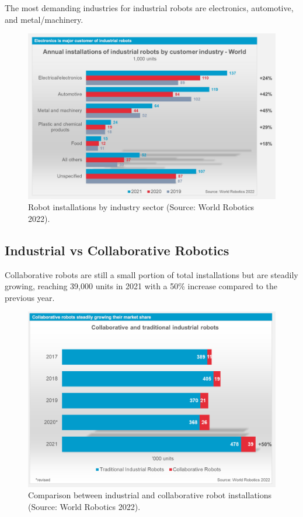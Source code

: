 The most demanding industries for industrial robots are electronics, automotive, and metal/machinery.

\begin{figure}[H]
  \centering
  \includegraphics[width=0.85\linewidth]{imgs/industrial_robotics_by_industry.png}
  \caption{Robot installations by industry sector (Source: World Robotics 2022).}
\end{figure}

\hfill

\subsection{Industrial vs Collaborative Robotics}

Collaborative robots are still a small portion of total installations but are steadily growing, reaching 39,000 units in 2021 with a 50\% increase compared to the previous year.

\begin{figure}[H]
  \centering
  \includegraphics[width=0.85\linewidth]{imgs/industrial_vs_collaborative_robots.png}
  \caption{Comparison between industrial and collaborative robot installations (Source: World Robotics 2022).}
\end{figure}

